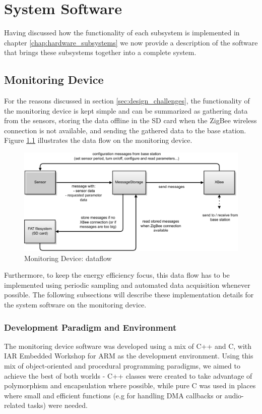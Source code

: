 \chapter{System Software}
\label{chap:system_software}
Having discussed how the functionality of each subsystem is implemented in chapter \ref{chap:hardware_subsystems} we now provide a description of the software that brings these subsystems together into a complete system. 


\section{Monitoring Device}
For the reasons discussed in section \ref{sec:design_challenges}, the functionality of the monitoring device is kept simple and can be summarized as gathering data from the sensors, storing the data offline in the SD card when the ZigBee wireless connection is not available, and sending the gathered data to the base station. Figure \ref{fig:dataflow_monitoring_device} illustrates the data flow on the monitoring device.

\begin{figure}
\includegraphics[width=\textwidth]{Images/monitoringdevice_dataflow}
\caption{Monitoring Device: dataflow}
\label{fig:dataflow_monitoring_device}
\end{figure}

Furthermore, to keep the energy efficiency focus, this data flow has to be implemented using periodic sampling and automated data acquisition whenever possible. The following subsections will describe these implementation details for the system software on the monitoring device.

\subsection{Development Paradigm and Environment}
\label{sec:dev_paradigm}
The monitoring device software was developed using a mix of C++ and C, with IAR Embedded Workshop for ARM as the development environment. Using this mix of object-oriented and procedural programming paradigms, we aimed to achieve the best of both worlds - C++ classes were created to take advantage of polymorphism and encapsulation where possible, while pure C was used in places where small and efficient functions (e.g for handling DMA callbacks or audio-related tasks) were needed.

